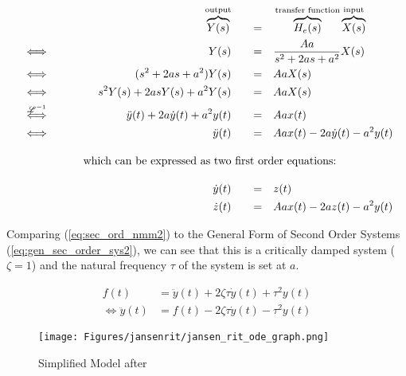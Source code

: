 \begin{alignat}{5}
	&                                           & &&          \overbrace{Y(s)}^{\text{output}} \quad &&=& \quad \overbrace{H_e(s)}^{\text{transfer function}} \overbrace{X(s)}^{\text{input}} \label{eq:laplace_domain2} \\
	&  \iff                                     & &&                             Y(s) \quad &&=& \quad \frac{Aa}{s^2+2as+a^2} X(s) \nonumber \\ 
	&  \iff                                     & &&               (s^2+2as+a^2) Y(s) \quad &&=& \quad AaX(s) \nonumber \\ 
	&  \iff                                     & &&          s^2Y(s)+2asY(s)+a^2Y(s) \quad &&=& \quad AaX(s) \nonumber \\ 
	&  \stackrel{\mathscr{L}^{-1}}{\iff} \qquad & && \ddot{y}(t)+2a\dot{y}(t)+a^2y(t) \quad &&=& \quad Aax(t) \nonumber \\ 
	&  \iff                                     & &&                      \ddot{y}(t) \quad &&=& \quad Aax(t)-2a\dot{y}(t)-a^2y(t)  \label{eq:sec_ord_nmm2} \\[1em]
	&                                           & \omit\rlap{which can be expressed as two first order equations:}                 \nonumber \\[1em]
	&                                           & &&                       \dot{y}(t) \quad &&=& \quad z(t) \nonumber \\ 
	&                                           & &&                       \dot{z}(t) \quad &&=& \quad Aax(t)-2az(t)-a^2y(t) \nonumber 
\end{alignat}

Comparing (\ref{eq:sec_ord_nmm2}) to the General Form of Second Order Systems (\ref{eq:gen_sec_order_sys2}), we can see that this is a critically damped system ($\zeta = 1$) and the natural frequency $\tau$ of the system is set at $a$.

\begin{align}
	f(t) &= \ddot{y}(t)+ 2\zeta \tau\dot{y}(t) + \tau^2y(t) \nonumber \\ 
	\iff  \ddot{y}(t) &= f(t) - 2\zeta \tau\dot{y}(t) - \tau^2y(t)  \label{eq:gen_sec_order_sys2}
\end{align}

\begin{figure}[H]
	\centering
	\texttt{[image: Figures/jansenrit/jansen\_rit\_ode\_graph.png]}
	\caption{Simplified Model after \parencite{jansen_electroencephalogram_1995}}
	\label{Fig: Jansen Rit Simple2}
\end{figure}

